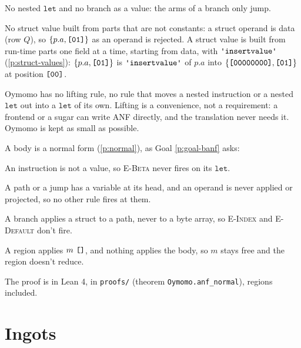 \documentclass[11pt,letterpaper]{article}
\newcommand{\rn}[1]{\textsc{#1}}                %
\newcommand{\kw}[1]{\mathtt{#1}}
\newcommand{\str}[1]{\text{\ttfamily\textquotesingle #1\textquotesingle}}  %
\newcommand{\hex}[1]{\text{\ttfamily [#1]}}  %
\newcounter{pt}
\newcommand{\pref}[1]{\ref{#1}}  %
\begin{document}
\begin{points}
\begin{subpoints}
  \item No nested $\kw{let}$ and no branch as a value: the arms of a branch only jump.
  \item No struct value built from parts that are not constants: a struct operand is data (row $Q$), so $\{p.a, \hex{01}\}$ as an operand is rejected. A struct value is built from run-time parts one
    field at a time, starting from data, with $\str{insertvalue}$ (\pref{p:struct-values}):
    $\{p.a, \hex{01}\}$ is $\str{insertvalue}$ of $p.a$ into $\{\hex{00000000}, \hex{01}\}$ at position $\hex{00}$.
  \item Oymomo has no lifting rule, no rule that moves a nested instruction or a nested $\kw{let}$ out into
    a $\kw{let}$ of its own. Lifting is a convenience, not a requirement: a frontend or a sugar can write ANF
    directly, and the translation never needs it. Oymomo is kept as small as possible.
  \end{subpoints}
\item\label{p:anf-normal} A body is a normal form (\pref{p:normal}), as Goal \pref{p:goal-banf} asks:
  \begin{subpoints}
  \item An instruction is not a value, so \rn{E-Beta} never fires on its $\kw{let}$.
  \item A path or a jump has a variable at its head, and an operand is never applied or projected, so no
    other rule fires at them.
  \item A branch applies a struct to a path, never to a byte array, so \rn{E-Index} and \rn{E-Default} don't fire.
  \item A region applies $m\ \hex{}$, and nothing applies the body, so $m$ stays free and the region doesn't reduce.
  \item The proof is in Lean 4, in \texttt{proofs/} (theorem \texttt{Oymomo.anf\_normal}), regions included.
  \end{subpoints}
\end{points}


\section{Ingots}\label{sec:modules}
\end{document}
